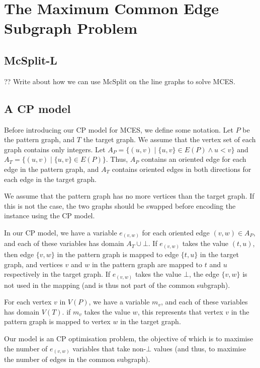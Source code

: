 \chapter{The Maximum Common Edge Subgraph Problem}
\label{c:mcsplite}

\section{McSplit-L}

?? Write about how we can use McSplit on the line graphs to solve MCES.

\section{A CP model} \label{sec:mces-cp-model}

Before introducing our CP model for MCES, we define some notation.  Let $P$ be the pattern graph,
and $T$ the target graph.  We assume that the vertex set of each graph contains only integers.
Let $A_P = \{(u,v) \mid \{u,v\} \in E(P) \wedge u < v \}$ and
    $A_T = \{(u,v) \mid \{u,v\} \in E(P) \}$.
Thus, $A_P$ contains an oriented edge for each edge in the pattern graph, and $A_T$ contains
oriented edges in both directions for each edge in the target graph.

We assume that the pattern graph has no more vertices than the target graph.  If this is not
the case, the two graphs should be swapped before encoding the instance using the CP model.

In our CP model, we have a variable $e_{(v,w)}$ for each oriented edge $(v,w) \in A_P$,
and each of these variables has domain $A_T \cup \bot$.  If $e_{(v,w)}$ takes the value $(t,u)$,
then edge $\{v,w\}$ in the pattern graph is mapped to edge $\{t,u\}$ in the target graph, and vertices
$v$ and $w$ in the pattern graph are mapped to $t$ and $u$ respectively in the target graph.
If $e_{(v,w)}$ takes the value $\bot$, the edge $\{v,w\}$ is not used in the mapping (and is thus not
part of the common subgraph).

For each vertex $v$ in $V(P)$, we have a variable $m_v$, and each of these variables has domain $V(T)$.
if $m_v$ takes the value $w$, this represents that vertex $v$ in the pattern graph is mapped to vertex
$w$ in the target graph.

Our model is an CP optimisation problem, the objective of which is to maximise
the number of $e_{(v,w)}$ variables that take non-$\bot$ values (and thus, to maximise the number of
edges in the common subgraph).

